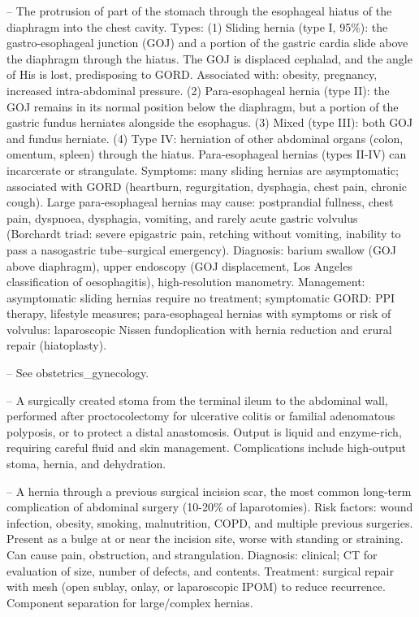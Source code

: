 -- The protrusion of part of the stomach through the esophageal hiatus of the diaphragm into the chest cavity. Types: (1) Sliding hernia (type I, 95\%): the gastro-esophageal junction (GOJ) and a portion of the gastric cardia slide above the diaphragm through the hiatus. The GOJ is displaced cephalad, and the angle of His is lost, predisposing to GORD. Associated with: obesity, pregnancy, increased intra-abdominal pressure. (2) Para-esophageal hernia (type II): the GOJ remains in its normal position below the diaphragm, but a portion of the gastric fundus herniates alongside the esophagus. (3) Mixed (type III): both GOJ and fundus herniate. (4) Type IV: herniation of other abdominal organs (colon, omentum, spleen) through the hiatus. Para-esophageal hernias (types II-IV) can incarcerate or strangulate. Symptoms: many sliding hernias are asymptomatic; associated with GORD (heartburn, regurgitation, dysphagia, chest pain, chronic cough). Large para-esophageal hernias may cause: postprandial fullness, chest pain, dyspnoea, dysphagia, vomiting, and rarely acute gastric volvulus (Borchardt triad: severe epigastric pain, retching without vomiting, inability to pass a nasogastric tube--surgical emergency). Diagnosis: barium swallow (GOJ above diaphragm), upper endoscopy (GOJ displacement, Los Angeles classification of oesophagitis), high-resolution manometry. Management: asymptomatic sliding hernias require no treatment; symptomatic GORD: PPI therapy, lifestyle measures; para-esophageal hernias with symptoms or risk of volvulus: laparoscopic Nissen fundoplication with hernia reduction and crural repair (hiatoplasty).

-- See obstetrics\_gynecology.

-- A surgically created stoma from the terminal ileum to the abdominal wall, performed after proctocolectomy for ulcerative colitis or familial adenomatous polyposis, or to protect a distal anastomosis. Output is liquid and enzyme-rich, requiring careful fluid and skin management. Complications include high-output stoma, hernia, and dehydration.

-- A hernia through a previous surgical incision scar, the most common long-term complication of abdominal surgery (10-20\% of laparotomies). Risk factors: wound infection, obesity, smoking, malnutrition, COPD, and multiple previous surgeries. Present as a bulge at or near the incision site, worse with standing or straining. Can cause pain, obstruction, and strangulation. Diagnosis: clinical; CT for evaluation of size, number of defects, and contents. Treatment: surgical repair with mesh (open sublay, onlay, or laparoscopic IPOM) to reduce recurrence. Component separation for large/complex hernias.

